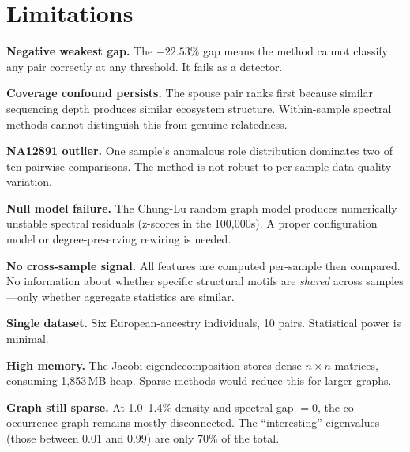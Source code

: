 \documentclass{../yalumba}
\begin{document}
\section{Limitations}
\label{sec:limitations}

\begin{limitation}
\textbf{Negative weakest gap.}  The $-22.53\%$ gap means the method cannot
classify any pair correctly at any threshold.  It fails as a detector.
\end{limitation}

\begin{limitation}
\textbf{Coverage confound persists.}  The spouse pair ranks first because
similar sequencing depth produces similar ecosystem structure.  Within-sample
spectral methods cannot distinguish this from genuine relatedness.
\end{limitation}

\begin{limitation}
\textbf{NA12891 outlier.}  One sample's anomalous role distribution dominates
two of ten pairwise comparisons.  The method is not robust to per-sample data
quality variation.
\end{limitation}

\begin{limitation}
\textbf{Null model failure.}  The Chung-Lu random graph model produces
numerically unstable spectral residuals (z-scores in the 100{,}000s).  A
proper configuration model or degree-preserving rewiring is needed.
\end{limitation}

\begin{limitation}
\textbf{No cross-sample signal.}  All features are computed per-sample then
compared.  No information about whether specific structural motifs are
\emph{shared} across samples---only whether aggregate statistics are similar.
\end{limitation}

\begin{limitation}
\textbf{Single dataset.}  Six European-ancestry individuals, 10 pairs.
Statistical power is minimal.
\end{limitation}

\begin{limitation}
\textbf{High memory.}  The Jacobi eigendecomposition stores dense $n \times n$
matrices, consuming 1{,}853\,MB heap.  Sparse methods would reduce this for
larger graphs.
\end{limitation}

\begin{limitation}
\textbf{Graph still sparse.}  At 1.0--1.4\% density and spectral gap $= 0$,
the co-occurrence graph remains mostly disconnected.  The ``interesting''
eigenvalues (those between 0.01 and 0.99) are only 70\% of the total.
\end{limitation}
\end{document}
